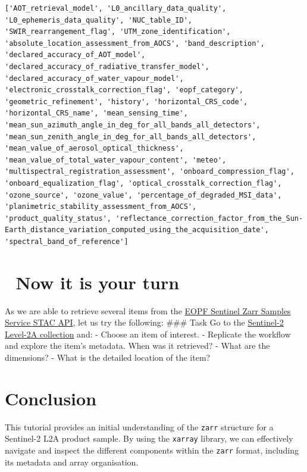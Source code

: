 \documentclass[
  letterpaper,
  DIV=11,
  numbers=noendperiod]{scrreprt}
\begin{document}
\begin{verbatim}
['AOT_retrieval_model', 'L0_ancillary_data_quality', 'L0_ephemeris_data_quality', 'NUC_table_ID', 'SWIR_rearrangement_flag', 'UTM_zone_identification', 'absolute_location_assessment_from_AOCS', 'band_description', 'declared_accuracy_of_AOT_model', 'declared_accuracy_of_radiative_transfer_model', 'declared_accuracy_of_water_vapour_model', 'electronic_crosstalk_correction_flag', 'eopf_category', 'geometric_refinement', 'history', 'horizontal_CRS_code', 'horizontal_CRS_name', 'mean_sensing_time', 'mean_sun_azimuth_angle_in_deg_for_all_bands_all_detectors', 'mean_sun_zenith_angle_in_deg_for_all_bands_all_detectors', 'mean_value_of_aerosol_optical_thickness', 'mean_value_of_total_water_vapour_content', 'meteo', 'multispectral_registration_assessment', 'onboard_compression_flag', 'onboard_equalization_flag', 'optical_crosstalk_correction_flag', 'ozone_source', 'ozone_value', 'percentage_of_degraded_MSI_data', 'planimetric_stability_assessment_from_AOCS', 'product_quality_status', 'reflectance_correction_factor_from_the_Sun-Earth_distance_variation_computed_using_the_acquisition_date', 'spectral_band_of_reference']
\end{verbatim}

\section{💪 Now it is your turn}\label{now-it-is-your-turn}

As we are able to retrieve several items from the
\href{https://stac.browser.user.eopf.eodc.eu/}{EOPF Sentinel Zarr
Samples Service STAC API}, let us try the following: \#\#\# Task Go to
the
\href{https://stac.browser.user.eopf.eodc.eu/collections/sentinel-2-l2a}{Sentinel-2
Level-2A collection} and: - Choose an item of interest. - Replicate the
workflow and explore the item's metadata. When was it retrieved? - What
are the dimensions? - What is the detailed location of the item?

\section{Conclusion}\label{conclusion-4}

This tutorial provides an initial understanding of the \texttt{zarr}
structure for a Sentinel-2 L2A product sample. By using the
\texttt{xarray} library, we can effectively navigate and inspect the
different components within the \texttt{zarr} format, including its
metadata and array organisation.
\end{document}
